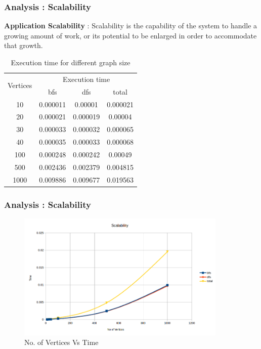 \documentclass{beamer}
\begin{document}
\begin{frame}
\frametitle{Analysis : Scalability}
\textbf{Application Scalability} : Scalability is the capability of the system to handle a growing amount of work, or its potential to be enlarged in order to accommodate that growth.\\

\begin{table}[h!]
\begin{center}
\begin{tabular}{|c|c|c|c|}

\hline

    \multirow{2}{*}{Vertices} & \multicolumn{3}{c|}{Execution time}\\
[0.5ex]
    \hhline{~---} 
    & bfs &  dfs&total
 \\
 \hline
10&	0.000011&	0.00001&	0.000021\\
\hline
20&	0.000021&	0.000019&	0.00004\\
\hline
30&	0.000033&	0.000032&	0.000065\\
\hline
40&	0.000035&	0.000033&	0.000068\\
\hline
100&	0.000248&	0.000242&	0.00049\\
\hline
500&	0.002436&	0.002379&	0.004815\\
\hline
1000&	0.009886&	0.009677&	0.019563\\
\hline    

    \end{tabular}
\caption{Execution time for different graph size}

\end{center}
\end{table}

\end{frame}
\begin{frame}
\frametitle{Analysis : Scalability}
\begin{figure}[h!]
\center
\includegraphics[width = 10cm]{image}
\caption{No. of Vertices Vs Time}
\end{figure}


\end{frame}
\end{document}
